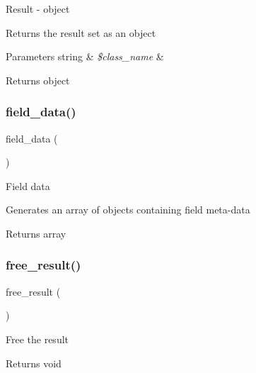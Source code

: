 Result -\/ object

Returns the result set as an object


\begin{DoxyParams}[1]{Parameters}
string & {\em \$class\+\_\+name} & \\
\hline
\end{DoxyParams}
\begin{DoxyReturn}{Returns}
object 
\end{DoxyReturn}
\mbox{\label{class_c_i___d_b__pdo__result_a84bffd65e53902ade1591716749a33e3}} 
\subsubsection{\texorpdfstring{field\+\_\+data()}{field\_data()}}
{\footnotesize\ttfamily field\+\_\+data (\begin{DoxyParamCaption}{ }\end{DoxyParamCaption})}

Field data

Generates an array of objects containing field meta-\/data

\begin{DoxyReturn}{Returns}
array 
\end{DoxyReturn}
\mbox{\label{class_c_i___d_b__pdo__result_aad2d98d6beb3d6095405356c6107b473}} 
\subsubsection{\texorpdfstring{free\+\_\+result()}{free\_result()}}
{\footnotesize\ttfamily free\+\_\+result (\begin{DoxyParamCaption}{ }\end{DoxyParamCaption})}

Free the result

\begin{DoxyReturn}{Returns}
void 
\end{DoxyReturn}
\mbox{\label{class_c_i___d_b__pdo__result_a50b54eb4ea7cfd039740f532988ea776}} 
